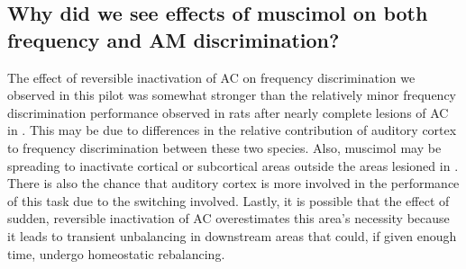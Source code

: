 %
%





%


\subsection{Why did we see effects of muscimol on both frequency and AM
discrimination?}

The effect of reversible inactivation of AC on frequency discrimination we observed in this pilot was somewhat stronger than the relatively minor frequency discrimination performance observed in rats after nearly complete lesions of AC in \citet{Gimenez2015}.
This may be due to differences in the relative contribution of auditory cortex to frequency discrimination between these two species. 
Also, muscimol may be spreading to inactivate cortical or subcortical areas outside the areas lesioned in \citet{Gimenez2015}.
There is also the chance that auditory cortex is more involved in the performance of this task due to the switching involved.
Lastly, it is possible that the effect of sudden, reversible inactivation of AC overestimates this area's necessity because it leads to transient unbalancing in downstream areas that could, if given enough time, undergo homeostatic rebalancing. 


